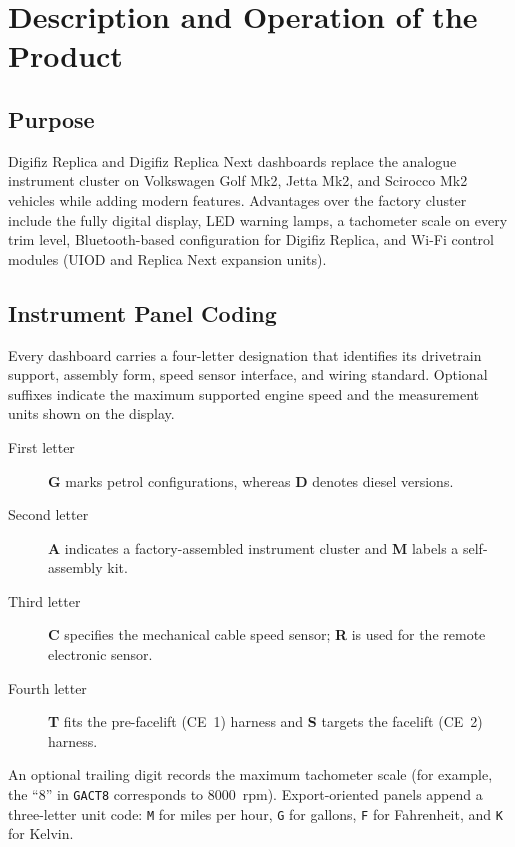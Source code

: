 \chapter{Description and Operation of the Product} \label{ch:description}

\section{Purpose}

Digifiz Replica and Digifiz Replica Next dashboards replace the analogue instrument cluster on Volkswagen Golf Mk2, Jetta Mk2, and Scirocco Mk2 vehicles while adding modern features.
Advantages over the factory cluster include the fully digital display, LED warning lamps, a tachometer scale on every trim level, Bluetooth-based configuration for Digifiz Replica, and Wi-Fi control modules (UIOD and Replica Next expansion units).

\section{Instrument Panel Coding}

Every dashboard carries a four-letter designation that identifies its drivetrain support, assembly form, speed sensor interface, and wiring standard.
Optional suffixes indicate the maximum supported engine speed and the measurement units shown on the display.

\begin{description}
    \item[First letter] \textbf{G} marks petrol configurations, whereas \textbf{D} denotes diesel versions.
    \item[Second letter] \textbf{A} indicates a factory-assembled instrument cluster and \textbf{M} labels a self-assembly kit.
    \item[Third letter] \textbf{C} specifies the mechanical cable speed sensor; \textbf{R} is used for the remote electronic sensor.
    \item[Fourth letter] \textbf{T} fits the pre-facelift (CE~1) harness and \textbf{S} targets the facelift (CE~2) harness.
\end{description}

An optional trailing digit records the maximum tachometer scale (for example, the ``8'' in \texttt{GACT8} corresponds to 8000~rpm).
Export-oriented panels append a three-letter unit code: \texttt{M} for miles per hour, \texttt{G} for gallons, \texttt{F} for Fahrenheit, and \texttt{K} for Kelvin.

